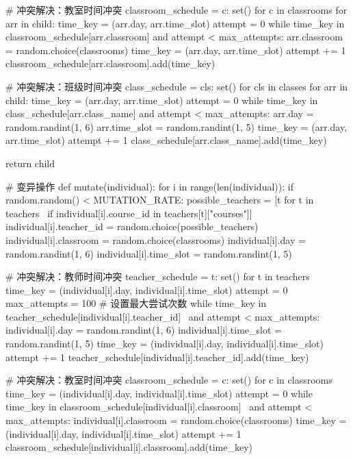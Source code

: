 \documentclass{ctexart}
\begin{document}
\begin{pythoncode}
	    # 冲突解决：教室时间冲突
	    classroom_schedule = {c: set() for c in classrooms}
	    for arr in child:
	        time_key = (arr.day, arr.time_slot)
	        attempt = 0
	        while time_key in classroom_schedule[arr.classroom] and attempt < max_attempts:
	            arr.classroom = random.choice(classrooms)
	            time_key = (arr.day, arr.time_slot)
	            attempt += 1
	        classroom_schedule[arr.classroom].add(time_key)
	
	    # 冲突解决：班级时间冲突
	    class_schedule = {cls: set() for cls in classes}
	    for arr in child:
	        time_key = (arr.day, arr.time_slot)
	        attempt = 0
	        while time_key in class_schedule[arr.class_name] and attempt < max_attempts:
	            arr.day = random.randint(1, 6)
	            arr.time_slot = random.randint(1, 5)
	            time_key = (arr.day, arr.time_slot)
	            attempt += 1
	        class_schedule[arr.class_name].add(time_key)
	
	    return child
	
	
	# 变异操作
	def mutate(individual):
	    for i in range(len(individual)):
	        if random.random() < MUTATION_RATE:
	            possible_teachers = [t for t in teachers \
	                                 if individual[i].course_id in teachers[t]["courses"]]
	            individual[i].teacher_id = random.choice(possible_teachers)
	            individual[i].classroom = random.choice(classrooms)
	            individual[i].day = random.randint(1, 6)
	            individual[i].time_slot = random.randint(1, 5)
	
	            # 冲突解决：教师时间冲突
	            teacher_schedule = {t: set() for t in teachers}
	            time_key = (individual[i].day, individual[i].time_slot)
	            attempt = 0
	            max_attempts = 100  # 设置最大尝试次数
	            while time_key in teacher_schedule[individual[i].teacher_id] \
	                    and attempt < max_attempts:
	                individual[i].day = random.randint(1, 6)
	                individual[i].time_slot = random.randint(1, 5)
	                time_key = (individual[i].day, individual[i].time_slot)
	                attempt += 1
	            teacher_schedule[individual[i].teacher_id].add(time_key)
	
	            # 冲突解决：教室时间冲突
	            classroom_schedule = {c: set() for c in classrooms}
	            time_key = (individual[i].day, individual[i].time_slot)
	            attempt = 0
	            while time_key in classroom_schedule[individual[i].classroom] \
	                    and attempt < max_attempts:
	                individual[i].classroom = random.choice(classrooms)
	                time_key = (individual[i].day, individual[i].time_slot)
	                attempt += 1
	            classroom_schedule[individual[i].classroom].add(time_key)
	

\end{pythoncode}
\end{document}
